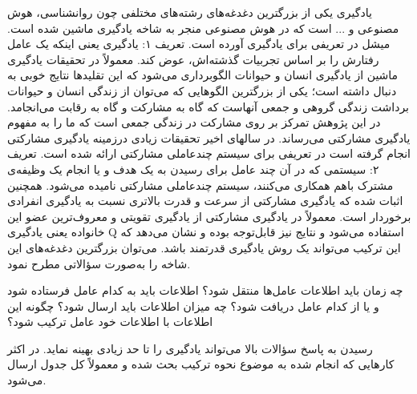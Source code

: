 \documentclass[12pt,a4paper]{article}
\begin{document}
یادگیری یکی از بزرگترین دغدغه‌های رشته‌های مختلفی چون روانشناسی، هوش مصنوعی و ... است که در هوش مصنوعی
منجر به شاخه یادگیری ماشین شده است. میشل در  تعریفی برای یادگیری آورده است.
تعریف ۱: یادگیری یعنی اینکه یک عامل رفتارش را بر اساس تجربیات گذشته‌اش، عوض کند.
معمولاً در تحقیقات یادگیری ماشین از یادگیری انسان و حیوانات الگوبرداری می‌شود که این تقلیدها نتایج خوبی به دنبال
داشته است؛ یکی از بزرگترین الگوهایی که می‌توان از زندگی انسان و حیوانات برداشت زندگی گروهی و جمعی آنهاست که
گاه به مشارکت و گاه به رقابت می‌انجامد. در این پژوهش تمرکز بر روی مشارکت در زندگی جمعی است که ما را به مفهوم
یادگیری مشارکتی می‌رساند. در سالهای اخیر تحقیقات زیادی درزمینه یادگیری مشارکتی انجام گرفته است در  تعریفی برای
سیستم چندعاملی مشارکتی ارائه شده است.
تعریف ۲: سیستمی که در آن چند عامل برای رسیدن به یک هدف و یا انجام یک وظیفه‌ی مشترک باهم همکاری می‌کنند،
سیستم چندعاملی مشارکتی نامیده می‌شود.
همچنین اثبات شده که یادگیری مشارکتی از سرعت و قدرت بالاتری نسبت به یادگیری انفرادی برخوردار است. معمولاً در
یادگیری مشارکتی از یادگیری تقویتی و معروف‌ترین عضو این خانواده یعنی یادگیری Q استفاده می‌شود و نتایج نیز قابل‌توجه بوده
و نشان می‌دهد که این ترکیب می‌تواند یک روش یادگیری قدرتمند باشد. می‌توان بزرگترین دغدغه‌های این شاخه را به‌صورت
سؤالاتی مطرح نمود.
\begin{enumerate}\setlength\itemsep{-.5em}
 چه زمان باید اطلاعات عامل‌ها منتقل شود؟
 اطلاعات باید به کدام عامل فرستاده شود و یا از کدام عامل دریافت شود؟
 چه میزان اطلاعات باید ارسال شود؟
 چگونه این اطلاعات با اطلاعات خود عامل ترکیب شود؟
\end{enumerate}
\newpage\noindent
رسیدن به پاسخ سؤالات بالا می‌تواند یادگیری را تا حد زیادی بهینه نماید. در اکثر کارهایی که انجام شده به موضوع نحوه
ترکیب بحث شده و معمولاً کل جدول ارسال می‌شود.
\end{document}
